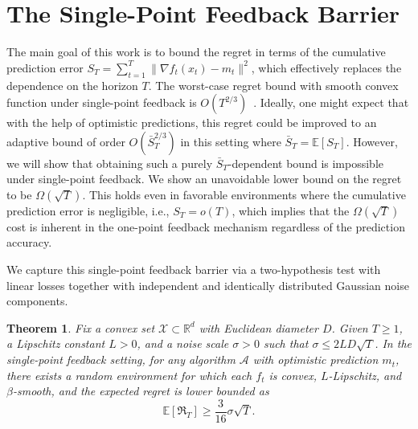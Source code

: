 \documentclass[journal,onecolumn]{IEEEtran}
\newcommand{\cA}{\mathcal{A}}
\newcommand{\cX}{\mathcal{X}}
\theoremstyle{plain}
\newtheorem{theorem}{Theorem}[section]
\theoremstyle{definition}
\theoremstyle{remark}
\newcommand{\regret}{\mathfrak{R}}
\begin{document}
\section{The Single-Point Feedback Barrier}
\label{sec:single_point}

The main goal of this work is to bound the regret in terms of the cumulative prediction error $S_{T}=\sum_{t=1}^{T}\|\nabla f_{t}(x_{t})-m_{t}\|^{2}$, which
effectively replaces the dependence on the horizon $T$. The worst-case
regret bound with smooth convex function under single-point feedback is $O(T^{2/3})$~\citep{saha2011improved}. Ideally, one
might expect that with the help of optimistic predictions, this regret could be
improved to an adaptive bound of order $O(\bar S_{T}^{2/3})$ in this setting where $\bar{S}_{T}= \mathbb{E}[S_{T}]$. However,
we will show that obtaining such a purely $\bar S_{T}$-dependent bound is impossible under single-point feedback. We show an unavoidable lower bound on the regret to be $\Omega(\sqrt{T})$. This holds
even in favorable environments where the cumulative prediction error is negligible, i.e., $S_{T}=o(T)$, which implies that the $\Omega(\sqrt{T})$ cost is inherent in the one-point feedback mechanism regardless
of the prediction accuracy.

We capture this single-point feedback barrier via a two-hypothesis test with linear
losses together with independent and identically distributed Gaussian noise components.

\begin{theorem}
    \label{thm:single_point_barrier} Fix a convex set $\cX\subset \mathbb{R}^{d}$
    with Euclidean diameter $D$. Given $T\ge 1$, a Lipschitz constant $L>0$, and
    a noise scale $\sigma > 0$ such that $\sigma \le 2LD\sqrt{T}$. In the single-point
    feedback setting, for any algorithm $\cA$ with optimistic prediction $m_{t}$,
    there exists a random environment for which each $f_{t}$ is convex, $L$-Lipschitz,
    and $\beta$-smooth, and the expected regret is lower bounded as
    \begin{equation*}
        \mathbb{E}[\regret_{T}]\geq \frac{3}{16}\sigma\sqrt{T}.
    \end{equation*}
\end{theorem}
\end{document}
